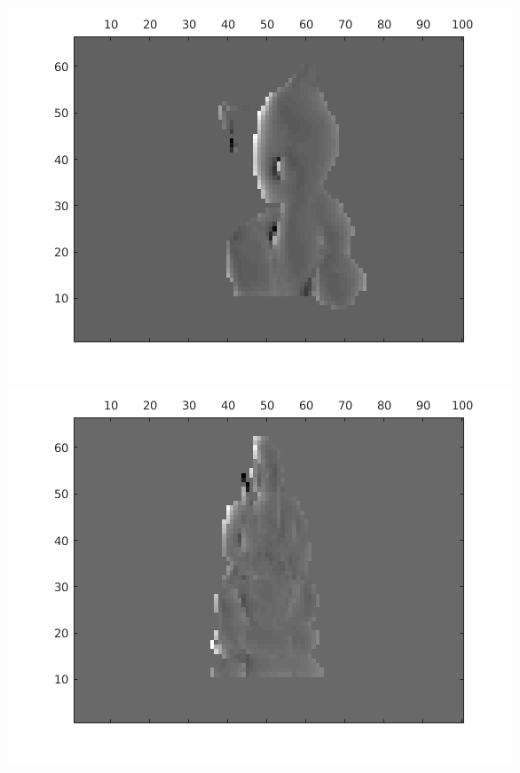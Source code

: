 \includegraphics[width=.4\linewidth]{imagenes/gato_small_dephs_789.png}
\includegraphics[width=.4\linewidth]{imagenes/buda_small_dephs_789.png}
